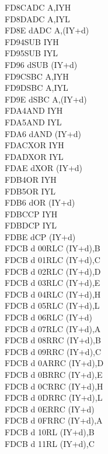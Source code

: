 \documentclass[12pt,twoside,openright,a4paper]{book}
\begin{document}
\begin{multicols}{3}
{\begin{tabbing}
	FD8C\>ADC A,IYH\UNDOC\\
	FD8D\>ADC A,IYL\UNDOC\\
	FD8E d\>ADC A,(IY+d)\\
	FD94\>SUB IYH\UNDOC\\
	FD95\>SUB IYL\UNDOC\\
	FD96 d\>SUB (IY+d)\\
	FD9C\>SBC A,IYH\UNDOC\\
	FD9D\>SBC A,IYL\UNDOC\\
	FD9E d\>SBC A,(IY+d)\\
	FDA4\>AND IYH\UNDOC\\
	FDA5\>AND IYL\UNDOC\\
	FDA6 d\>AND (IY+d)\\
	FDAC\>XOR IYH\UNDOC\\
	FDAD\>XOR IYL\UNDOC\\
	FDAE d\>XOR (IY+d)\\
	FDB4\>OR IYH\UNDOC\\
	FDB5\>OR IYL\UNDOC\\
	FDB6 d\>OR (IY+d)\\
	FDBC\>CP IYH\UNDOC\\
	FDBD\>CP IYL\UNDOC\\
	FDBE d\>CP (IY+d)\\
	FDCB d 00\>RLC (IY+d),B\UNDOC\\
	FDCB d 01\>RLC (IY+d),C\UNDOC\\
	FDCB d 02\>RLC (IY+d),D\UNDOC\\
	FDCB d 03\>RLC (IY+d),E\UNDOC\\
	FDCB d 04\>RLC (IY+d),H\UNDOC\\
	FDCB d 05\>RLC (IY+d),L\UNDOC\\
	FDCB d 06\>RLC (IY+d)\\
	FDCB d 07\>RLC (IY+d),A\UNDOC\\
	FDCB d 08\>RRC (IY+d),B\UNDOC\\
	FDCB d 09\>RRC (IY+d),C\UNDOC\\
	FDCB d 0A\>RRC (IY+d),D\UNDOC\\
	FDCB d 0B\>RRC (IY+d),E\UNDOC\\
	FDCB d 0C\>RRC (IY+d),H\UNDOC\\
	FDCB d 0D\>RRC (IY+d),L\UNDOC\\
	FDCB d 0E\>RRC (IY+d)\\
	FDCB d 0F\>RRC (IY+d),A\UNDOC\\
	FDCB d 10\>RL (IY+d),B\UNDOC\\
	FDCB d 11\>RL (IY+d),C\UNDOC\\

\end{tabbing}}
\end{multicols}
\end{document}
